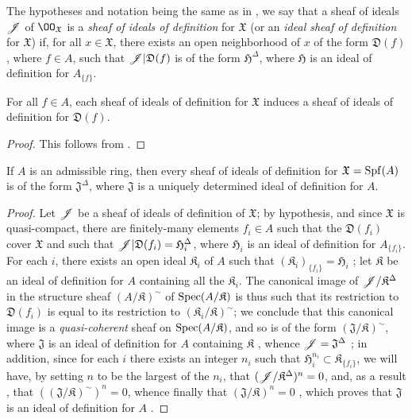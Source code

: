 \begin{env}[10.3.3]
\label{1.10.3.3}
The hypotheses and notation being the same as in , we say that a sheaf of ideals $\mathscr{J}$ of $\OO_\mathfrak{X}$ is a \emph{sheaf of ideals of definition} for $\mathfrak{X}$ (or an \emph{ideal sheaf of definition} for $\mathfrak{X}$) if, for all $x\in\mathfrak{X}$, there exists an open neighborhood of $x$ of the form $\mathfrak{D}(f)$, where $f\in A$, such that $\mathscr{J}|\mathfrak{D}(f)$ is of the form $\mathfrak{H}^\Delta$, where $\mathfrak{H}$ is an ideal of definition for $A_{\{f\}}$.
\end{env}

\begin{prop}[10.3.4]
\label{1.10.3.4}
For all $f\in A$, each sheaf of ideals of definition for $\mathfrak{X}$ induces a sheaf of ideals of definition for $\mathfrak{D}(f)$.
\end{prop}

\begin{proof}
\label{proof-1.10.3.4}
This follows from .
\end{proof}

\begin{prop}[10.3.5]
\label{1.10.3.5}
If $A$ is an admissible ring, then every sheaf of ideals of definition for $\mathfrak{X}=\operatorname{Spf}(A)$ is of the form $\mathfrak{J}^\Delta$, where $\mathfrak{J}$ is a uniquely determined ideal of definition for $A$.
\end{prop}

\begin{proof}
\label{proof-1.10.3.5}
Let $\mathscr{J}$ be a sheaf of ideals of definition of $\mathfrak{X}$; by hypothesis, and since $\mathfrak{X}$ is quasi-compact, there are finitely-many elements $f_i\in A$ such that the $\mathfrak{D}(f_i)$ cover $\mathfrak{X}$ and such that $\mathscr{J}|\mathfrak{D}(f_i)=\mathfrak{H}_i^\Delta$, where $\mathfrak{H}_i$ is an ideal of definition for $A_{\{f_i\}}$.
For each $i$, there exists an open ideal $\mathfrak{K}_i$ of $A$ such that $(\mathfrak{K}_i)_{\{f_i\}}=\mathfrak{H}_i$ ; let $\mathfrak{K}$ be an ideal of definition for $A$ containing all the $\mathfrak{K}_i$.
The canonical image of $\mathscr{J}/\mathfrak{K}^\Delta$ in the structure sheaf $(A/\mathfrak{K})^\sim$ of $\operatorname{Spec}(A/\mathfrak{K})$  is thus such that its restriction to $\mathfrak{D}(f_i)$ is equal to its restriction to $(\mathfrak{K}_i/\mathfrak{K})^\sim$;
we conclude that this canonical image is a \emph{quasi-coherent} sheaf on $\operatorname{Spec}(A/\mathfrak{K})$, and so is of the form $(\mathfrak{J}/\mathfrak{K})^\sim$, where $\mathfrak{J}$ is an ideal of definition for $A$ containing $\mathfrak{K}$ , whence $\mathscr{J}=\mathfrak{J}^\Delta$ ;
in addition, since for each $i$ there exists an integer $n_i$ such that $\mathfrak{H}_i^{n_i}\subset\mathfrak{K}_{\{f_i\}}$, we will have, by setting $n$ to be the largest of the $n_i$, that $(\mathscr{J}/\mathfrak{K}^\Delta)^n=0$, and, as a result , that $((\mathfrak{J}/\mathfrak{K})^\sim)^n=0$, whence finally that $(\mathfrak{J}/\mathfrak{K})^n=0$ , which proves that $\mathfrak{J}$ is an ideal of definition for $A$ .
\end{proof}

